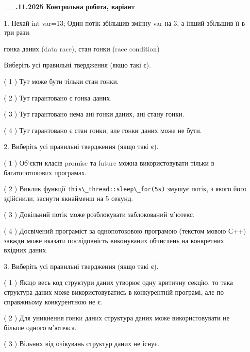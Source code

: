 \documentclass[12pt, ukrainian]{article}
\def\code#1{\Verb!#1!}
\begin{document}
\newpage
\begin {large}

\textbf{\_\_.11.2025 Контрольна робота, варіант  }\par


{
1. Нехай int var=13; Один потік збільшив змінну var на 3, а інший збільшив її в три рази.

гонка даних (data race), стан гонки (race condition)

Виберіть усі правильні твердження (якщо такі є).\par
\vspace{2mm}
( 1 ) Тут може бути тільки стан гонки.%

( 2 ) Тут гарантовано є гонка даних.%

( 3 ) Тут гарантовано нема ані гонки даних, ані стану гонки.%

( 4 ) Тут гарантовано є стан гонки, але гонки даних може не бути.%


2. Виберіть усі правильні твердження (якщо такі є).\par
\vspace{2mm}

( 1 ) Об’єкти класів promise та future можна використовувати тільки в багатопотокових програмах.%

( 2 ) Виклик функції \code{this\_thread::sleep\_for(5s)} змушує потік, з якого його здійснили, заснути якнайменш на 5 секунд.%

( 3 ) Довільний потік може розблокувати заблокований м’ютекс.%

( 4 ) Досвічений програміст за однопотоковою програмою (текстом мовою С++) завжди може вказати послідовність виконуваних обчислень на конкретних вхідних даних.%


3. Виберіть усі правильні твердження (якщо такі є).\par
\vspace{2mm}

( 1 ) Якщо весь код структури даних утворює одну критичну секцію, то така структура даних може використовуватись в конкурентній програмі, але по-справжньо\-му конкурентною не є.%

( 2 ) Для уникнення гонки даних структура даних може використовувати не більше одного м’ютекса.%

( 3 ) Вільних від очікувань структур даних не існує.%

}
\end{large}
\end{document}

